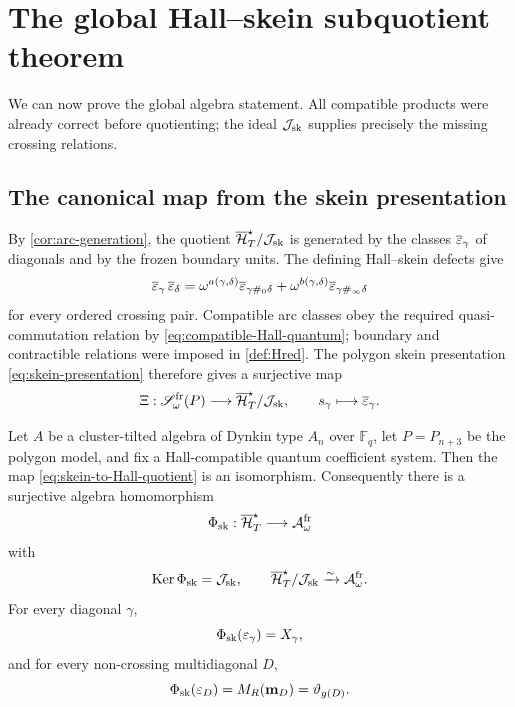 \section{The global Hall--skein subquotient theorem}
\label{sec:subquotient}

We can now prove the global algebra statement.  All compatible products were
already correct before quotienting; the ideal $\mathcal J_{\mathrm{sk}}$ supplies precisely the
missing crossing relations.

\subsection{The canonical map from the skein presentation}

By \cref{cor:arc-generation}, the quotient $\overline{\mathcal H}_{T}^{\star}/\mathcal J_{\mathrm{sk}}$ is generated by the
classes $\overline{\varepsilon}_\gamma$ of diagonals and by the frozen boundary units.
The defining Hall--skein defects give
\begin{equation}
 \overline{\varepsilon}_\gamma\,\overline{\varepsilon}_\delta
 =\omega^{a(\gamma,\delta)}
   \overline{\varepsilon}_{\gamma\#_0\delta}
 +\omega^{b(\gamma,\delta)}
   \overline{\varepsilon}_{\gamma\#_\infty\delta}
 \label{eq:quotient-skein-relation}
\end{equation}
for every ordered crossing pair.  Compatible arc classes obey the required
quasi-commutation relation by
\eqref{eq:compatible-Hall-quantum}; boundary and contractible relations were
imposed in \cref{def:Hred}.  The polygon skein presentation
\eqref{eq:skein-presentation} therefore gives a surjective map
\begin{equation}
 \Xi:
 \mathscr S_\omega^{\rm fr}(P)
 \longrightarrow
 \overline{\mathcal H}_{T}^{\star}/\mathcal J_{\mathrm{sk}},
 \qquad
 s_\gamma\longmapsto\overline{\varepsilon}_\gamma.
 \label{eq:skein-to-Hall-quotient}
\end{equation}

\begin{theorem}
\label{thm:Hall-skein-subquotient}
Let $A$ be a cluster-tilted algebra of Dynkin type $A_n$ over
$\mathbb F_q$, let $P=P_{n+3}$ be the polygon model, and fix a
Hall-compatible quantum coefficient system.  Then the map
\eqref{eq:skein-to-Hall-quotient} is an isomorphism.  Consequently there is a
surjective algebra homomorphism
\begin{equation}
 \Phi_{\rm sk}:
 \overline{\mathcal H}_{T}^{\star}\longrightarrow\mathcal A_{\omega}^{\mathrm{fr}}
 \label{eq:global-Hall-cluster-map}
\end{equation}
with
\begin{equation}
 \operatorname{Ker}\Phi_{\rm sk}=\mathcal J_{\mathrm{sk}},
 \qquad
 \overline{\mathcal H}_{T}^{\star}/\mathcal J_{\mathrm{sk}}\xrightarrow{\sim}\mathcal A_{\omega}^{\mathrm{fr}}.
 \label{eq:global-subquotient}
\end{equation}
For every diagonal $\gamma$,
\[
 \Phi_{\rm sk}(\varepsilon_\gamma)=X_\gamma,
\]
and for every non-crossing multidiagonal $D$,
\[
 \Phi_{\rm sk}(\varepsilon_D)
 =M_R(\mathbf m_D)=\vartheta_{g(D)}.
\]
\end{theorem}

